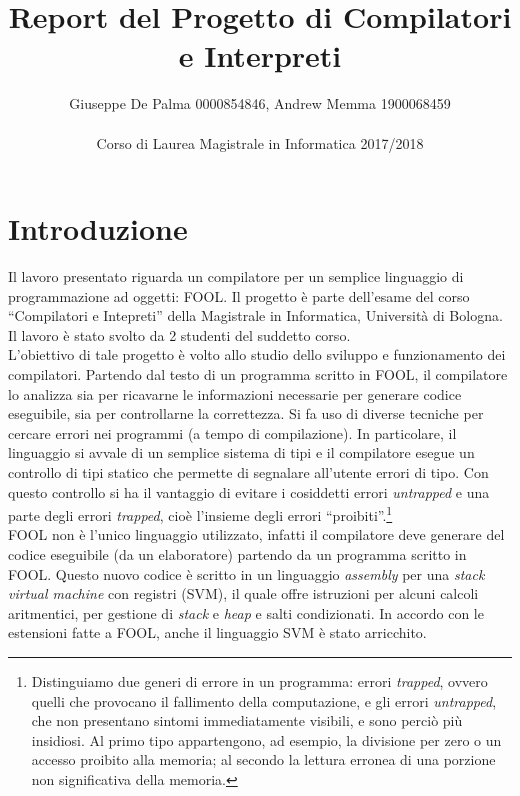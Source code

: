 \documentclass{scrreprt}
\title{Report del Progetto di Compilatori e Interpreti}
\date{}
\author{Giuseppe De Palma 0000854846, Andrew Memma 1900068459\\
\\Corso di Laurea Magistrale in Informatica 2017/2018}
\begin{document}
\maketitle

\tableofcontents

\chapter{Introduzione}
Il lavoro presentato riguarda un compilatore per un semplice linguaggio di programmazione ad oggetti: FOOL. Il progetto è parte dell'esame del corso ``Compilatori e Intepreti'' della Magistrale in Informatica, Università di Bologna. Il lavoro è stato svolto da 2 studenti del suddetto corso.\\

L'obiettivo di tale progetto è volto allo studio dello sviluppo e funzionamento dei compilatori. Partendo dal testo di un programma scritto in FOOL, il compilatore lo analizza sia per ricavarne le informazioni necessarie per generare codice eseguibile, sia per controllarne la correttezza. Si fa uso di diverse tecniche per cercare errori nei programmi (a tempo di compilazione). In particolare, il linguaggio si avvale di un semplice sistema di tipi e il compilatore esegue un controllo di tipi statico che permette di segnalare all'utente errori di tipo. Con questo controllo si ha il vantaggio di evitare i cosiddetti errori \textit{untrapped} e una parte degli errori \textit{trapped}, cioè l'insieme degli errori ``proibiti''.\footnote{Distinguiamo due generi di errore in un programma: errori \textit{trapped}, ovvero quelli che provocano il fallimento della computazione, e gli errori	\textit{untrapped}, che non	presentano sintomi immediatamente visibili, e sono perciò più insidiosi. Al primo tipo appartengono, ad esempio, la divisione per zero o un accesso proibito alla memoria; al secondo la lettura erronea di una porzione non significativa della memoria.}\\

FOOL non è l'unico linguaggio utilizzato, infatti il compilatore deve generare del codice eseguibile (da un elaboratore) partendo da un programma scritto in FOOL. Questo nuovo codice è scritto in un linguaggio \textit{assembly} per una \textit{stack virtual machine} con registri (SVM), il quale offre istruzioni per alcuni calcoli aritmentici, per gestione di \textit{stack} e \textit{heap} e salti condizionati. In accordo con le estensioni fatte a FOOL, anche il linguaggio SVM è stato arricchito.
\end{document}
